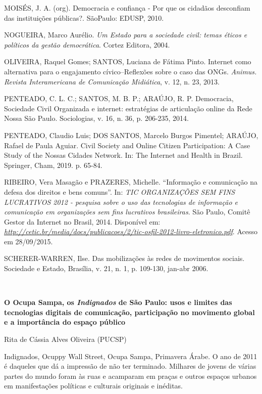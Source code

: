 MOISÉS, J. A. (org). Democracia e confiança - Por que os cidadãos
desconfiam das instituições públicas?. SãoPaulo: EDUSP, 2010.

NOGUEIRA, Marco Aurélio. \emph{Um Estado para a sociedade civil: temas
éticos e políticos da gestão democrática}. Cortez Editora, 2004.

OLIVEIRA, Raquel Gomes; SANTOS, Luciana de Fátima Pinto. Internet como
alternativa para o engajamento cívico--Reflexões sobre o caso das ONGs.
\emph{Animus. Revista Interamericana de Comunicação Midiática}, v. 12,
n. 23, 2013.

PENTEADO, C. L. C.; SANTOS, M. B. P.; ARAÚJO, R. P. Democracia,
Sociedade Civil Organizada e internet: estratégias de articulação online
da Rede Nossa São Paulo. Sociologias, v. 16, n. 36, p. 206-235, 2014.

PENTEADO, Claudio Luis; DOS SANTOS, Marcelo Burgos Pimentel; ARAÚJO,
Rafael de Paula Aguiar. Civil Society and Online Citizen Participation:
A Case Study of the Nossas Cidades Network. In: The Internet and Health
in Brazil. Springer, Cham, 2019. p. 65-84.

RIBEIRO, Vera Masagão e PRAZERES, Michelle. ``Informação e comunicação
na defesa dos direitos e bens comuns''. In: \emph{TIC ORGANIZAÇÕES SEM
FINS LUCRATIVOS 2012 - pesquisa sobre o uso das tecnologias de
informação e comunicação em organizações sem fins lucrativos
brasileiras}. São Paulo, Comitê Gestor da Internet no Brasil, 2014.
Disponível em:
\href{http://cetic.br/media/docs/publicacoes/2/tic-osfil-2012-livro-eletronico.pdf}{\emph{http://cetic.br/media/docs/publicacoes/2/tic-osfil-2012-livro-eletronico.pdf}}.
Acesso em 28/09/2015.

SCHERER-WARREN, Ilse. Das mobilizações às redes de movimentos sociais.
Sociedade e Estado, Brasília, v. 21, n. 1, p. 109-130, jan-abr 2006.

\textbf{\\
}

\textbf{O Ocupa Sampa, os \emph{Indignados} de São Paulo: usos e limites
das tecnologias digitais de comunicação, participação no movimento
global e a importância do espaço público }

Rita de Cássia Alves Oliveira (PUCSP)

Indignados, Ocuppy Wall Street, Ocupa Sampa, Primavera Árabe. O ano de
2011 é daqueles que dá a impressão de não ter terminado. Milhares de
jovens de várias partes do mundo foram às ruas e acamparam em praças e
outros espaços urbanos em manifestações políticas e culturais originais
e inéditas.

